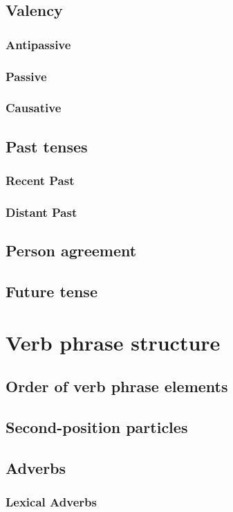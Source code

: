 \documentclass[a4paper, 12pt, oneside]{memoir}
\begin{document}
\subsection{Valency}\label{svvalency}
\subsubsection{Antipassive}
\subsubsection{Passive}
\subsubsection{Causative}
\subsection{Past tenses}\label{svpast}
\subsubsection{Recent Past}
\subsubsection{Distant Past}
\subsection{Person agreement}\label{svperson}
\subsection{Future tense}\label{svfut}
\section{Verb phrase structure}
\subsection{Order of verb phrase elements}\label{svorder}
\subsection{Second-position particles}\label{svparticles}
\subsection{Adverbs}\label{svadverbs}
\subsubsection{Lexical Adverbs}
\end{document}
